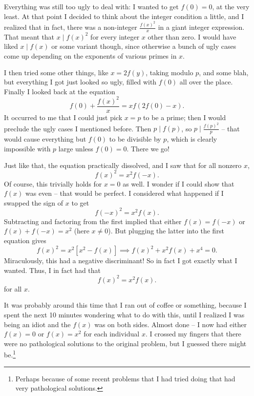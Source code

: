 \documentclass[11pt]{scrartcl}
\begin{document}
Everything was still too ugly to deal with: I wanted to get $f(0) = 0$, at the very least.
At that point I decided to think about the integer condition a little, and I realized that in fact, there was a non-integer $\frac{f(x)^2}{x}$ in a giant integer expression. That meant that $x \mid f(x)^2$ for every integer $x$ other than zero.
I would have liked $x \mid f(x)$ or some variant though, since otherwise a bunch of ugly cases come up depending on the exponents of various primes in $x$.

I then tried some other things, like $x=2f(y)$, taking modulo $p$, and some blah, but everything I got just looked so ugly, filled with $f(0)$ all over the place. Finally I looked back at the equation
\[ f(0) + \frac{f(x)^2}{x} = xf(2f(0)-x). \]
It occurred to me that I could just pick $x=p$ to be a prime; then I would preclude the ugly cases I mentioned before.
Then $p \mid f(p)$, so $p \mid \frac{f(p)^2}{p}$ -- that would cause everything but $f(0)$ to be divisible by $p$, which is clearly impossible with $p$ large unless $f(0) = 0$. There we go!

Just like that, the equation practically dissolved, and I saw that for all nonzero $x$,
\[ f(x)^2 = x^2 f(-x). \]
Of course, this trivially holds for $x=0$ as well. I wonder if I could show that $f(x)$ was even -- that would be perfect.
I considered what happened if I swapped the sign of $x$ to get
\[ f(-x)^2 = x^2f(x). \]
Subtracting and factoring from the first implied that either $f(x) = f(-x)$ or $f(x) + f(-x) = x^2$ (here $x \neq 0$). But plugging the latter into the first equation gives
\[ f(x)^2 = x^2 \left[ x^2 - f(x) \right] \implies f(x)^2 + x^2 f(x) + x^4 = 0. \]
Miraculously, this had a negative discriminant!
So in fact I got exactly what I wanted. Thus, I in fact had that
\[ f(x)^2 = x^2f(x). \]
for all $x$.

It was probably around this time that I ran out of coffee or something, because I spent the next 10 minutes wondering what to do with this, until I realized I was being an idiot and the $f(x)$ was on both sides. Almost done -- I now had either $f(x) = 0$ or $f(x) = x^2$ for each individual $x$.
I crossed my fingers that there were no pathological solutions to the original problem, but I guessed there might be.\footnote{Perhaps because of some recent problems that I had tried doing that had very pathological solutions.}
\end{document}
